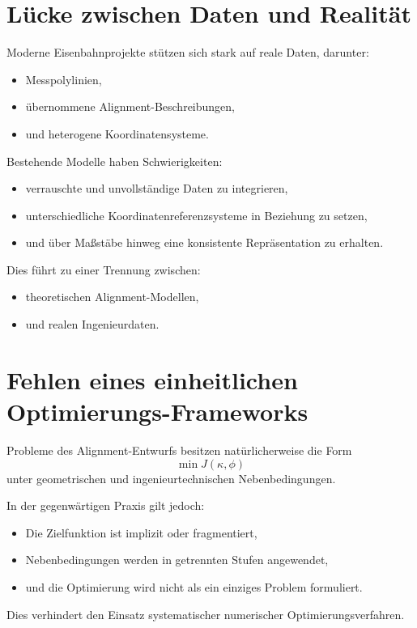 \section{Lücke zwischen Daten und Realität}

Moderne Eisenbahnprojekte stützen sich stark auf reale Daten, darunter:
\begin{itemize}
\item Messpolylinien,
\item übernommene Alignment-Beschreibungen,
\item und heterogene Koordinatensysteme.
\end{itemize}

Bestehende Modelle haben Schwierigkeiten:
\begin{itemize}
\item verrauschte und unvollständige Daten zu integrieren,
\item unterschiedliche Koordinatenreferenzsysteme in Beziehung zu setzen,
\item und über Maßstäbe hinweg eine konsistente Repräsentation zu erhalten.
\end{itemize}

Dies führt zu einer Trennung zwischen:
\begin{itemize}
\item theoretischen Alignment-Modellen,
\item und realen Ingenieurdaten.
\end{itemize}

\section{Fehlen eines einheitlichen Optimierungs-Frameworks}

Probleme des Alignment-Entwurfs besitzen natürlicherweise die Form
\[
\min J(\kappa,\phi)
\]
unter geometrischen und ingenieurtechnischen Nebenbedingungen.

In der gegenwärtigen Praxis gilt jedoch:
\begin{itemize}
\item Die Zielfunktion ist implizit oder fragmentiert,
\item Nebenbedingungen werden in getrennten Stufen angewendet,
\item und die Optimierung wird nicht als ein einziges Problem formuliert.
\end{itemize}

Dies verhindert den Einsatz systematischer numerischer
Optimierungsverfahren.

